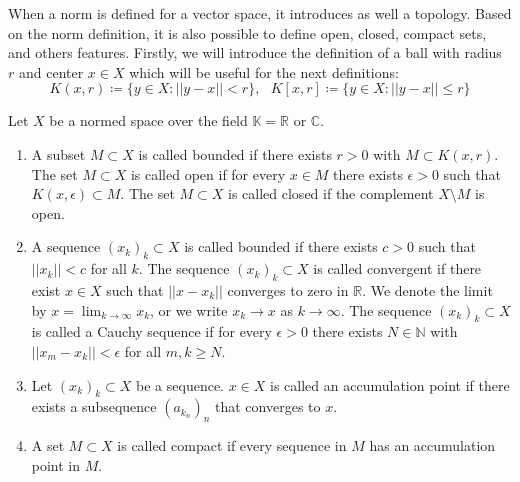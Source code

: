 			When a norm is defined for a vector space, it introduces as well a topology. Based on the norm definition, it is also possible to define open, closed, compact sets, and others features. Firstly, we will introduce the definition of a ball with radius $r$  and center $x\in X$ which will be useful for the next definitions: $$K(x, r) \coloneqq \{y\in X : ||y-x|| <r\},~~~ K[x,r] \coloneqq \{y\in X : ||y-x|| \le r\}$$
			\begin{definition}\label{def:app:functional:4}
				Let $X$ be a normed space over the field $\mathbb{K}=\mathbb{R}$ or $\mathbb{C}$.
				\begin{enumerate}
					\item A subset $M\subset X$ is called bounded if there exists $r>0$ with $M\subset K(x,r)$. The set $M\subset X$ is called open if for every $x\in M$ there exists $\epsilon>0$ such that $K(x,\epsilon)\subset M$. The set $M\subset X$ is called closed if the complement $X\setminus M$ is open.
					\item A sequence $(x_k)_k\subset X$ is called bounded if there exists $c>0$ such that $||x_k||<c$ for all $k$. The sequence $(x_k)_k\subset X$ is called convergent if there exist $x\in X$ such that $||x-x_k||$ converges to zero in $\mathbb{R}$. We denote the limit by $x=\lim_{k\rightarrow\infty}x_k$, or we write $x_k\rightarrow x$ as $k\rightarrow\infty$. The sequence $(x_k)_k\subset X$ is called a Cauchy sequence if for every $\epsilon > 0$ there exists $N\in\mathbb{N}$ with $||x_m-x_k|| < \epsilon$ for all $m,k\ge N$.
					\item Let $(x_k)_k\subset X$ be a sequence. $x\in X$ is called an accumulation point if there exists a subsequence $(a_{k_n})_n$ that converges to $x$.
					\item A set $M\subset X$ is called compact if every sequence in $M$ has an accumulation point in $M$.
				\end{enumerate}
			\end{definition} 
		
